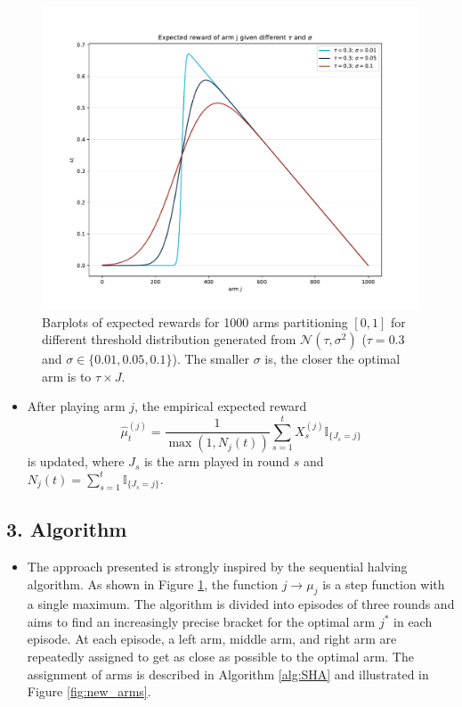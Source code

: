 \documentclass[
	landscape, %
]{ImperialPoster}
\begin{document}
\begin{multicols}{4}
	\begin{figure}[H] %
		\includegraphics[width=\linewidth]{"../../../../figures/expect_rew.pdf"} %
		\caption{Barplots of expected rewards for 1000 arms partitioning $[0,1]$ for different threshold distribution generated from $\mathcal{N}(\tau, \sigma^2)$ ($\tau = 0.3$ and $\sigma \in \{0.01, 0.05, 0.1\}$).
		The smaller $\sigma$ is, the closer the optimal arm is to $\tau \times J$.}
		\label{fig:exp_rew}
	\end{figure}
	\begin{itemize}
		\item After playing arm $j$, the \textcolor{ICLBlue}{empirical expected reward} 
		$$\hat{\mu}^{(j)}_t = \frac{1}{\max\left(1,N_j(t)\right)}\sum_{s=1}^{t} X_{s}^{(j)} \mathbb{I}_{\{J_s = j\}}$$ is updated, where $J_s$ is the 
		arm played in round $s$ and $N_j(t) = \sum_{s=1}^{t}\mathbb{I}_{\{J_s = j\}}$.
	\end{itemize}

	\subsection{3. Algorithm}
	
	\begin{itemize}
		\item The approach presented is strongly inspired by the \textcolor{ICLBlue}{sequential halving algorithm}\cite{SHA}. As shown in Figure \ref{fig:exp_rew}, the function
		$j \rightarrow \mu_j$ is a step function with a single maximum. The algorithm is divided into episodes of three rounds and aims to find an increasingly precise bracket for the optimal arm $j^*$
		in each episode. At each episode, a left arm, middle arm, and right arm are repeatedly assigned to get as close as possible to the optimal arm.
		The assignment of arms is described in Algorithm \ref{alg:SHA} and illustrated in Figure \ref{fig:new_arms}.
	\end{itemize}


\end{multicols}
\end{document}

